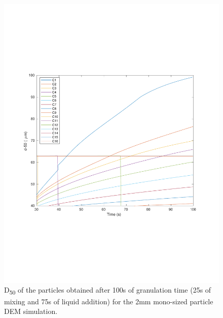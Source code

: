 \documentclass[preprint,11pt,authoryear]{elsarticle}
\begin{document}
\begin{figure}
\centering
\includegraphics[scale=0.5]{rslts_pbm_d50_128_200.pdf}
\caption{D\textsubscript{50} of the particles obtained after 100s of granulation time (25s of mixing and 75s of 
liquid addition) for the 2mm mono-sized particle DEM simulation.}
\label{fig:rslts_PBM_2mm_d50}
\end{figure}
\end{document}
